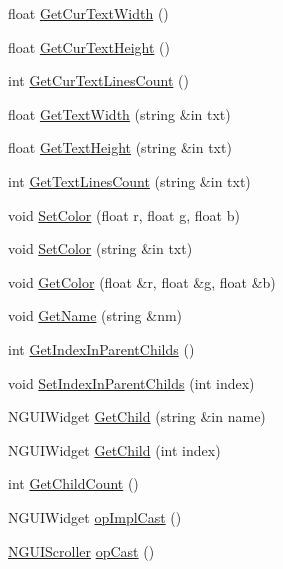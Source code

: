 \begin{DoxyCompactItemize}
float \hyperlink{class_n_g_u_i_scroller_a1e1726960f5dada0d73dbe4f7e4d5bc2}{Get\+Cur\+Text\+Width} ()
\item 
float \hyperlink{class_n_g_u_i_scroller_aed84cc5ea9bf4e336a9175fb3372549b}{Get\+Cur\+Text\+Height} ()
\item 
int \hyperlink{class_n_g_u_i_scroller_aeaf819af0c0d02221293677069ce616d}{Get\+Cur\+Text\+Lines\+Count} ()
\item 
float \hyperlink{class_n_g_u_i_scroller_a45ecf196597209676c51b949dd92a7f5}{Get\+Text\+Width} (string \&in txt)
\item 
float \hyperlink{class_n_g_u_i_scroller_a0e9d9d11e167f61a981c82da48a1da05}{Get\+Text\+Height} (string \&in txt)
\item 
int \hyperlink{class_n_g_u_i_scroller_a8d7fa4b42fe883712eba894ea34fb8c7}{Get\+Text\+Lines\+Count} (string \&in txt)
\item 
void \hyperlink{class_n_g_u_i_scroller_a7ad461d068758753269a160cd246018d}{Set\+Color} (float r, float g, float b)
\item 
void \hyperlink{class_n_g_u_i_scroller_afe567ab5f67defdb11e2fbdbb6708989}{Set\+Color} (string \&in txt)
\item 
void \hyperlink{class_n_g_u_i_scroller_a2c3e6851f92ebea8edff2829772933c7}{Get\+Color} (float \&r, float \&g, float \&b)
\item 
void \hyperlink{class_n_g_u_i_scroller_af8ce78fca34f1ef23a6f21d97dec14e5}{Get\+Name} (string \&nm)
\item 
int \hyperlink{class_n_g_u_i_scroller_a4f283e5cb6434d88cf871857e1c38241}{Get\+Index\+In\+Parent\+Childs} ()
\item 
void \hyperlink{class_n_g_u_i_scroller_a20a3e37118cdd15fed96c56b5e147932}{Set\+Index\+In\+Parent\+Childs} (int index)
\item 
N\+G\+U\+I\+Widget \hyperlink{class_n_g_u_i_scroller_addf4b4986c391985cb136ba7e62c735d}{Get\+Child} (string \&in name)
\item 
N\+G\+U\+I\+Widget \hyperlink{class_n_g_u_i_scroller_a84ebefffcfce7cb03ed21da1b810f76e}{Get\+Child} (int index)
\item 
int \hyperlink{class_n_g_u_i_scroller_aed38bc77c34224b61197ac33621f3f2d}{Get\+Child\+Count} ()
\item 
N\+G\+U\+I\+Widget \hyperlink{class_n_g_u_i_scroller_aedfa64a01cefe036c5d48fdb7c3dd671}{op\+Impl\+Cast} ()
\item 
\hyperlink{class_n_g_u_i_scroller}{N\+G\+U\+I\+Scroller} \hyperlink{class_n_g_u_i_scroller_a4b73e76568d944720f8f9e8396917b4c}{op\+Cast} ()

\end{DoxyCompactItemize}
